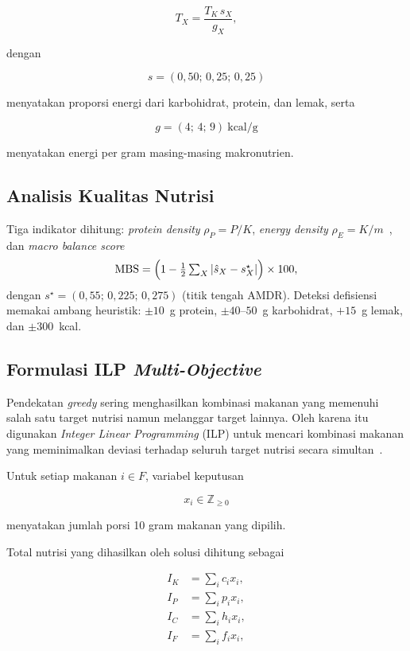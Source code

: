 \documentclass[conference]{IEEEtran}
\begin{document}
\begin{equation}
T_X=\frac{T_K\,s_X}{g_X},
\end{equation}

dengan

\[
s=(0{,}50;\,0{,}25;\,0{,}25)
\]

menyatakan proporsi energi dari
karbohidrat, protein, dan lemak, serta

\[
g=(4;\,4;\,9)\ \text{kcal/g}
\]

menyatakan energi per gram masing-masing
makronutrien.

\subsection{Analisis Kualitas Nutrisi}
Tiga indikator dihitung: \textit{protein density} $\rho_P = P/K$, \textit{energy density} $\rho_E = K/m$~\cite{rolls2009dietary}, dan \textit{macro balance score}
\begin{equation}
\text{MBS} = \Bigl(1 - \tfrac{1}{2}\textstyle\sum_X |\hat{s}_X - s_X^{\star}|\Bigr)\times 100,
\end{equation}
dengan $s^{\star}=(0{,}55;\,0{,}225;\,0{,}275)$ (titik tengah AMDR). Deteksi defisiensi memakai ambang heuristik: $\pm10$~g protein, $\pm 40$--$50$~g karbohidrat, $+15$~g lemak, dan $\pm 300$~kcal.

\subsection{Formulasi ILP \textit{Multi-Objective}}

Pendekatan \textit{greedy} sering menghasilkan kombinasi
makanan yang memenuhi salah satu target nutrisi namun
melanggar target lainnya. Oleh karena itu digunakan
\textit{Integer Linear Programming} (ILP) untuk mencari
kombinasi makanan yang meminimalkan deviasi terhadap
seluruh target nutrisi secara simultan~\cite{wolsey1998integer}.

Untuk setiap makanan $i\in F$, variabel keputusan

\[
x_i \in \mathbb{Z}_{\ge 0}
\]

menyatakan jumlah porsi 10 gram makanan yang dipilih.

Total nutrisi yang dihasilkan oleh solusi dihitung sebagai

\begin{align}
I_K &= \sum_i c_i x_i,\\
I_P &= \sum_i p_i x_i,\\
I_C &= \sum_i h_i x_i,\\
I_F &= \sum_i f_i x_i,
\end{align}
\end{document}
